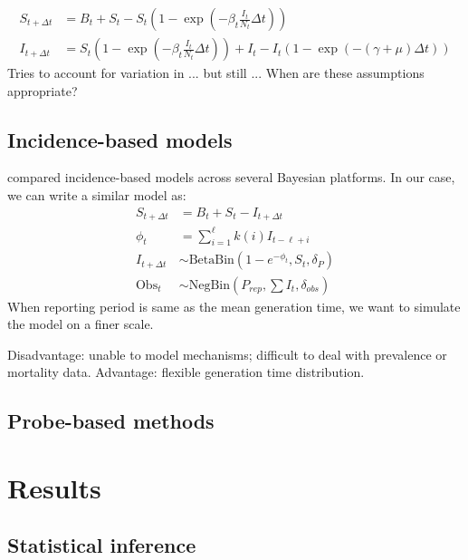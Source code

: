 \documentclass{article}
\begin{document}
\begin{equation}
\begin{aligned}
S_{t + \Delta t} &= B_t + S_t - S_t \left(1- \exp\left(-\beta_t \frac{I_t}{N_t} \Delta t\right)\right)\\
I_{t + \Delta t} &= S_t \left( 1- \exp\left(-\beta_t \frac{I_t}{N_t} \Delta t\right)\right) + I_t - I_t (1 - \exp(-(\gamma + \mu) \Delta t))
\end{aligned}
\end{equation}
Tries to account for variation in ... but still ... When are these assumptions appropriate?

\subsection{Incidence-based models}

\cite{li2018fitting} compared incidence-based models across several Bayesian platforms.
In our case, we can write a similar model as:
\begin{equation}
\begin{aligned}
S_{t + \Delta t} &= B_t + S_t - I_{t+\Delta t}\\
\phi_t &= \sum_{i=1}^\ell k(i) I_{t - \ell +i}\\
I_{t + \Delta t} &\sim \mathrm{BetaBin}(1- e^{-\phi_t}, S_t,\delta_P)\\
\mathrm{Obs}_t &\sim \mathrm{NegBin}(P_{rep}, \sum I_t, \delta_{obs})
\end{aligned}
\end{equation}
When reporting period is same as the mean generation time, we want to simulate the model on a finer scale.

Disadvantage: unable to model mechanisms; difficult to deal with prevalence or mortality data.
Advantage: flexible generation time distribution.



\subsection{Probe-based methods}

\section{Results}

\subsection{Statistical inference}
\end{document}
